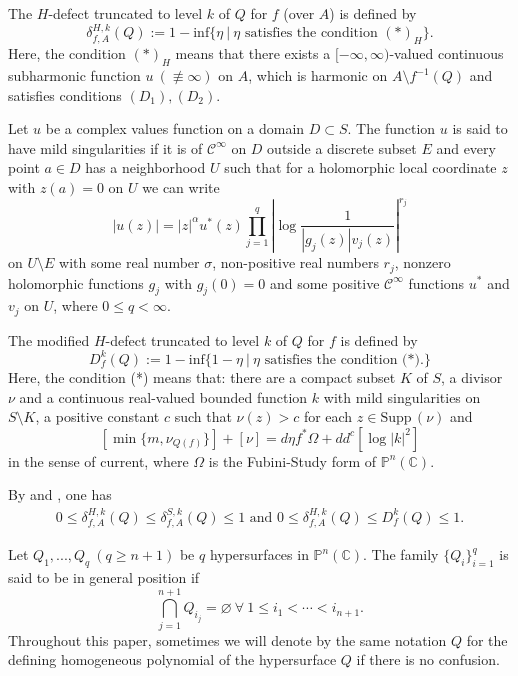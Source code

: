 \documentclass[12pt,article]{amsart}
\newcommand{\C}{{\mathbb{C}}}
\renewcommand{\P}{{\mathbb{P}}}
\newcommand{\supp}{\mathrm{Supp}\,}
\numberwithin{equation}{section}
\begin{document}
The $H$-defect truncated to level $k$ of $Q$ for $f$ (over $A$) is defined by
$$\delta^{H,k}_{f,A}(Q):=1- \mathrm{inf}\{\eta\ |\ \eta \text{ satisfies the condition }(*)_H\}.$$
Here, the condition $(*)_H$ means that there exists a $[-\infty,\infty)$-valued continuous subharmonic function $u\ (\not\equiv\infty)$ on $A$, which is harmonic on $A\setminus f^{-1}(Q)$ and satisfies conditions $(D_1),(D_2)$.

Let $u$ be a complex values function on a domain $D\subset S$. The function $u$ is said to have mild singularities if it is of $\mathcal C^\infty$ on $D$ outside a discrete subset $E$ and every point $a\in D$ has a neighborhood $U$ such that for a holomorphic local coordinate $z$ with $z(a)=0$ on $U$ we can write
$$ |u(z)|=|z|^\alpha u^*(z)\prod_{j=1}^q\left|\log\dfrac{1}{|g_j(z)|v_j(z)}\right|^{r_j}$$
on $U\setminus E$ with some real number $\sigma$, non-positive real numbers $r_j$, nonzero holomorphic functions $g_j$ with $g_j(0)=0$ and some positive $\mathcal C^{\infty}$ functions $u^*$ and $v_j$ on $U$, where $0\le q<\infty$.

The modified $H$-defect truncated to level $k$ of $Q$ for $f$  is defined by
$$D^k_{f}(Q) := 1 - \mathrm{inf}\{1-\eta\ |\ \eta \text{ satisfies the condition (*)}.\}$$
Here, the condition (*) means that: there are a compact subset $K$ of $S$, a divisor $\nu$ and a continuous real-valued bounded function $k$ with mild singularities on $S\setminus K$, a positive constant $c$ such that $\nu(z)>c$ for each $z\in\supp (\nu)$ and
$$ [\min\{m,\nu_{Q(f)}\}]+[\nu]=d\eta f^*\Omega+dd^c[\log|k|^2] $$
in the sense of current, where $\Omega$ is the Fubini-Study form of $\P^n(\C)$. 


By \cite[Proposition 2.3]{Fu90} and \cite[Remark 5.3]{Fu91}, one has
\begin{align*}
0 \le  \delta^{H,k}_{f,A}(Q) \le  \delta^{S,k}_{f,A}(Q)\le  1\text{ and }0 \le \delta^{H,k}_{f,A}(Q)\le D^{k}_{f}(Q)\le 1.
\end{align*}

Let $Q_1,...,Q_q\ (q\ge n+1)$ be $q$ hypersurfaces in $\P^n(\C)$. The family $\{Q_i\}_{i=1}^q$ is said to be in general position if 
$$ \bigcap_{j=1}^{n+1}Q_{i_j}=\varnothing \ \forall\ 1\le i_1<\cdots <i_{n+1}.$$
Throughout this paper, sometimes we will denote by the same notation $Q$ for the defining homogeneous polynomial of the hypersurface $Q$ if there is no confusion.
\end{document}
